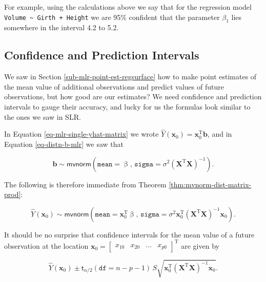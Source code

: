 \documentclass[]{book}
\numberwithin{equation}{chapter}
\numberwithin{figure}{chapter}
\theoremstyle{plain}
\theoremstyle{definition}
\theoremstyle{remark}
\theoremstyle{definition}
\theoremstyle{definition}
\theoremstyle{remark}
\begin{document}
For example, using the calculations above we say that for the regression
model \texttt{Volume\ \textasciitilde{}\ Girth\ +\ Height} we are 95\%
confident that the parameter \(\beta_{1}\) lies somewhere in the
interval 4.2 to 5.2.

\subsection{Confidence and Prediction
Intervals}\label{confidence-and-prediction-intervals}

We saw in Section \ref{sub-mlr-point-est-regsurface} how to make point
estimates of the mean value of additional observations and predict
values of future observations, but how good are our estimates? We need
confidence and prediction intervals to gauge their accuracy, and lucky
for us the formulas look similar to the ones we saw in SLR.

In Equation \eqref{eq-mlr-single-yhat-matrix} we wrote
\(\hat{Y}(\mathbf{x}_0)=\mathbf{x}_0^{\mathrm{T}}\mathbf{b}\), and in
Equation \eqref{eq-distn-b-mlr} we saw that

\begin{equation}
\mathbf{b}\sim\mathsf{mvnorm}\left(\mathtt{mean} = \upbeta,\,\mathtt{sigma}=\sigma^{2}\left(\mathbf{X}^{\mathrm{T}}\mathbf{X}\right)^{-1}\right).
\end{equation}

The following is therefore immediate from Theorem
\ref{thm:mvnorm-dist-matrix-prod}:

\begin{equation}
\hat{Y}(\mathbf{x}_{0})\sim\mathsf{mvnorm}\left(\mathtt{mean}=\mathbf{x}_{0}^{\mathrm{T}}\upbeta,\,\mathtt{sigma}=\sigma^{2}\mathbf{x}_{0}^{\mathrm{T}}\left(\mathbf{X}^{\mathrm{T}}\mathbf{X}\right)^{-1}\mathbf{x}_{0}\right).
\end{equation}

It should be no surprise that confidence intervals for the mean value of
a future observation at the location
\(\mathbf{x}_{0}=\begin{bmatrix}x_{10} & x_{20} & \ldots & x_{p0}\end{bmatrix}^{\mathrm{T}}\)
are given by

\begin{equation}
\hat{Y}(\mathbf{x}_{0})\pm\mathsf{t}_{\alpha/2}(\mathtt{df}=n-p-1)\, S\sqrt{\mathbf{x}_{0}^{\mathrm{T}}\left(\mathbf{X}^{\mathrm{T}}\mathbf{X}\right)^{-1}\mathbf{x}_{0}}.
\end{equation}
\end{document}
